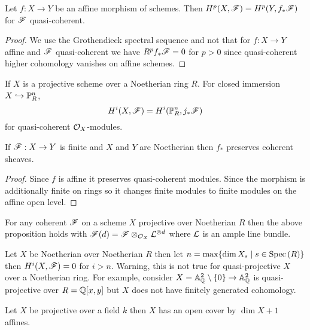 \documentclass[12pt]{article}
\begin{document}
\begin{lemma}
Let $f : X \to Y$ be an affine morphism of schemes. Then $H^p(X, \mathscr{F}) = H^p(Y, f_* \mathscr{F})$ for $\mathscr{F}$ quasi-coherent.
\end{lemma}

\begin{proof}
We use the Grothendieck spectral sequence and not that for $f : X \to Y$ affine and $\mathscr{F}$ quasi-coherent we have $R^p f_* \mathscr{F} = 0$ for $p > 0$ since quasi-coherent higher cohomology vanishes on affine schemes. 
\end{proof}

\begin{example}
If $X$ is a projective scheme over a Noetherian ring $R$. For closed immersion $X \hookrightarrow \mathbb{P}^n_R$,
\[ H^i(X, \mathscr{F}) = H^i(\mathbb{P}^n_R, j_* \mathscr{F}) \]
for quasi-coherent $\mathcal{O}_{X}$-modules.
\end{example}

\begin{lemma}
If $\mathscr{F} : X \to Y$ is finite and $X$ and $Y$ are Noetherian then $f_*$ preserves coherent sheaves.
\end{lemma}

\begin{proof}
Since $f$ is affine it preserves quasi-coherent modules. Since the morphism is additionally finite on rings so it changes finite modules to finite modules on the affine open level. 
\end{proof}

\begin{cor}
For any coherent $\mathscr{F}$ on a scheme $X$ projective over Noetherian $R$ then the above proposition holds with $\mathscr{F}(d) = \mathscr{F} \otimes_{\mathcal{O}_{X}} \mathcal{L}^{\otimes d}$ where $\mathcal{L}$ is an ample line bundle.
\end{cor}

\begin{rmk}
Let $X$ be Noetherian over Noetherian $R$ then let $n = \max\{ \dim X_s \mid s \in \mathrm{Spec}\left( R \right) \}$ then $H^i(X, \mathscr{F}) = 0$ for $i > n$. Warning, this is not true for quasi-projective $X$ over a Noetherian ring. For example, consider $X = \mathbb{A}^2_{\mathbb{Q}} \setminus \{ 0 \} \to \mathbb{A}^2_{\mathbb{Q}}$ is quasi-projective over $R = \mathbb{Q}[x,y]$ but $X$ does not have finitely generated cohomology. 
\end{rmk}

\begin{lemma}
Let $X$ be projective over a field $k$ then $X$ has an open cover by $\dim{X} + 1$ affines.
\end{lemma}
\end{document}
